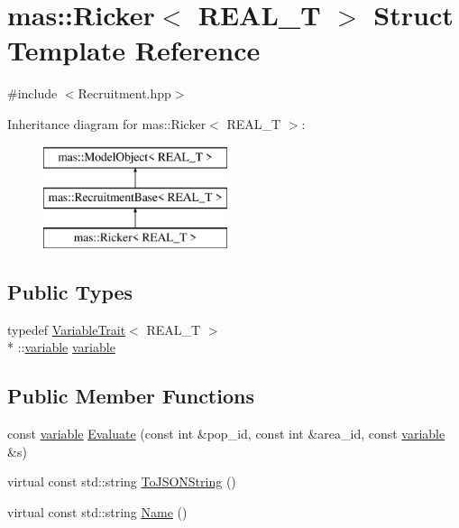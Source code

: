 \hypertarget{structmas_1_1_ricker}{\section{mas\-:\-:Ricker$<$ R\-E\-A\-L\-\_\-\-T $>$ Struct Template Reference}
\label{structmas_1_1_ricker}
}


{\ttfamily \#include $<$Recruitment.\-hpp$>$}

Inheritance diagram for mas\-:\-:Ricker$<$ R\-E\-A\-L\-\_\-\-T $>$\-:\begin{figure}[H]
\begin{center}
\leavevmode
\includegraphics[height=3.000000cm]{structmas_1_1_ricker}
\end{center}
\end{figure}
\subsection*{Public Types}
\begin{DoxyCompactItemize}
\item 
typedef \hyperlink{structmas_1_1_variable_trait}{Variable\-Trait}$<$ R\-E\-A\-L\-\_\-\-T $>$\\*
\-::\hyperlink{structmas_1_1_ricker_a1e7489f196696277bb4c4fab0b5db240}{variable} \hyperlink{structmas_1_1_ricker_a1e7489f196696277bb4c4fab0b5db240}{variable}
\end{DoxyCompactItemize}
\subsection*{Public Member Functions}
\begin{DoxyCompactItemize}
\item 
const \hyperlink{structmas_1_1_ricker_a1e7489f196696277bb4c4fab0b5db240}{variable} \hyperlink{structmas_1_1_ricker_ab5b9063ac4db823f6d6413a336dc3dc2}{Evaluate} (const int \&pop\-\_\-id, const int \&area\-\_\-id, const \hyperlink{structmas_1_1_ricker_a1e7489f196696277bb4c4fab0b5db240}{variable} \&s)
\item 
virtual const std\-::string \hyperlink{structmas_1_1_ricker_af6cb56b70e0449cfb5fdfab757971560}{To\-J\-S\-O\-N\-String} ()
\item 
virtual const std\-::string \hyperlink{structmas_1_1_ricker_a7628e704459668064aeab604c223ebb5}{Name} ()
\end{DoxyCompactItemize}
